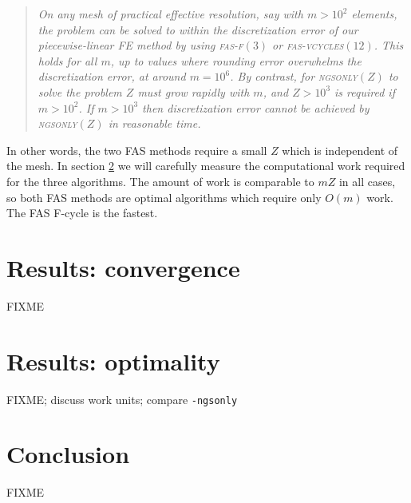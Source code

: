 \documentclass[letterpaper,final,12pt,reqno]{amsart}
\begin{document}
\begin{quotation}
\emph{On any mesh of practical effective resolution, say with $m>10^2$ elements, the problem can be solved to within the discretization error of our piecewise-linear FE method by using \textsc{fas-f}$(3)$ or \textsc{fas-vcycles}$(12)$.  This holds for all $m$, up to values where rounding error overwhelms the discretization error, at around $m=10^6$.  By contrast, for \textsc{ngsonly}$(Z)$ to solve the problem $Z$ must grow rapidly with $m$, and $Z > 10^3$ is required if $m>10^2$.  If $m>10^3$ then discretization error cannot be achieved by \textsc{ngsonly}$(Z)$ in reasonable time.}
\end{quotation}

In other words, the two FAS methods require a small $Z$ which is independent of the mesh.  In section \ref{sec:optimal} we will carefully measure the computational work required for the three algorithms.  The amount of work is comparable to $mZ$ in all cases, so both FAS methods are optimal algorithms which require only $O(m)$ work.  The FAS F-cycle is the fastest.


\section{Results: convergence}  \label{sec:convergence}

FIXME


\section{Results: optimality}  \label{sec:optimal}

FIXME; discuss work units; compare \texttt{-ngsonly}


\section{Conclusion}  \label{sec:conclusion}

FIXME


\small

\bigskip


\end{document}
